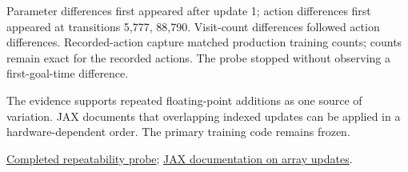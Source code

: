 Parameter differences first appeared after update 1; action differences first appeared at transitions 5,777, 88,790. Visit-count differences followed action differences. Recorded-action capture matched production training counts; counts remain exact for the recorded actions. The probe stopped without observing a first-goal-time difference.

The evidence supports repeated floating-point additions as one source of variation. JAX documents that overlapping indexed updates can be applied in a hardware-dependent order. The primary training code remains frozen.

\href{\detokenize{/p/rlprojects/RND/10_jax_exploration_platform/runs/2026-10-31-21-48_initial-bonus_uniform-random-adversarial-neural_policy-tabular-neural_count-inverse-square-root_steps-262144-to-16777216_seeds-development-0-15_confirmation-10000-10511/data/repeatability/duplicate_tabular_policy_seeds.json}}{Completed repeatability probe}; \href{https://docs.jax.dev/en/latest/_autosummary/jax.numpy.ndarray.at.html}{JAX documentation on array updates}.
